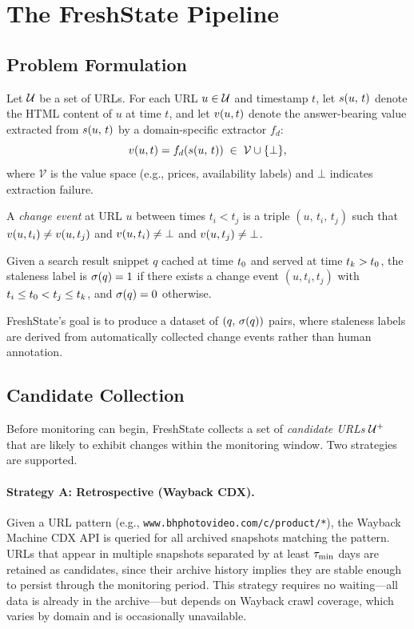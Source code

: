 \section{The FreshState Pipeline}
\label{sec:method}

\subsection{Problem Formulation}

Let $\mathcal{U}$ be a set of URLs. For each URL $u \in \mathcal{U}$ and timestamp $t$, let
$s(u,\,t)$ denote the HTML content of $u$ at time $t$, and let $v(u, t)$
denote the answer-bearing value extracted from $s(u,\,t)$ by a domain-specific
extractor $f_d$:
\[
  v(u, t) = f_d\!\left(s(u,\,t)\right) \;\in\; \mathcal{V} \cup \{\bot\},
\]
where $\mathcal{V}$ is the value space (e.g., prices, availability labels) and
$\bot$ indicates extraction failure.

\begin{definition}
  A \emph{change event} at URL $u$ between times $t_i < t_j$ is a triple
  $(u,\, t_i,\, t_j)$ such that $v(u, t_i) \neq v(u, t_j)$ and
  $v(u, t_i) \neq \bot$ and $v(u, t_j) \neq \bot$.
\end{definition}

\begin{definition}
  Given a search result snippet $q$ cached at time $t_0$ and served at time
  $t_k > t_0$, the staleness label is $\sigma(q) = 1$ if there exists a
  change event $(u, t_i, t_j)$ with $t_i \leq t_0 < t_j \leq t_k$, and
  $\sigma(q) = 0$ otherwise.
\end{definition}

FreshState's goal is to produce a dataset of $(q,\, \sigma(q))$ pairs, where
staleness labels are derived from automatically collected change events rather than
human annotation.

\subsection{Candidate Collection}

Before monitoring can begin, FreshState collects a set of \emph{candidate URLs}
$\mathcal{U}^+$ that are likely to exhibit changes within the monitoring window. Two
strategies are supported.

\paragraph{Strategy A: Retrospective (Wayback CDX).}
Given a URL pattern (e.g., \texttt{www.bhphotovideo.com/c/product/*}), the
Wayback Machine CDX API is queried for all archived snapshots matching the pattern.
URLs that appear in multiple snapshots separated by at least $\tau_{\min}$ days are
retained as candidates, since their archive history implies they are stable enough
to persist through the monitoring period. This strategy requires no waiting---all
data is already in the archive---but depends on Wayback crawl coverage, which varies
by domain and is occasionally unavailable.

